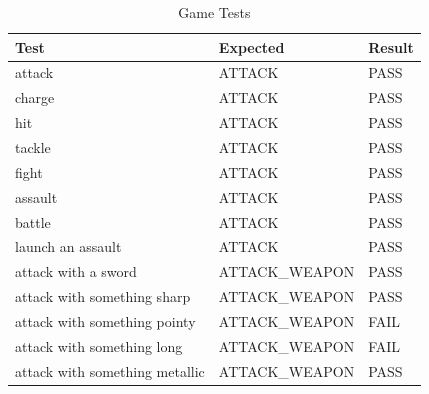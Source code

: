 \documentclass[11pt]{article}
\begin{document}
\begin{table}[H]
\scriptsize
\centering
\caption{Game Tests}
\label{table:game-scores}
\begin{tabular}{lll}
\multicolumn{1}{l|}{Test}                           & \multicolumn{1}{l|}{Expected}           & Result                       \\ \hline
\multicolumn{1}{l|}{attack}                         & \multicolumn{1}{l|}{ATTACK}             & \cellcolor[HTML]{67FD9A}PASS \\ \hline
\multicolumn{1}{l|}{charge}                         & \multicolumn{1}{l|}{ATTACK}             & \cellcolor[HTML]{67FD9A}PASS \\ \hline
\multicolumn{1}{l|}{hit}                            & \multicolumn{1}{l|}{ATTACK}             & \cellcolor[HTML]{67FD9A}PASS \\ \hline
\multicolumn{1}{l|}{tackle}                         & \multicolumn{1}{l|}{ATTACK}             & \cellcolor[HTML]{67FD9A}PASS \\ \hline
\multicolumn{1}{l|}{fight}                          & \multicolumn{1}{l|}{ATTACK}             & \cellcolor[HTML]{67FD9A}PASS \\ \hline
\multicolumn{1}{l|}{assault}                        & \multicolumn{1}{l|}{ATTACK}             & \cellcolor[HTML]{67FD9A}PASS \\ \hline
\multicolumn{1}{l|}{battle}                         & \multicolumn{1}{l|}{ATTACK}             & \cellcolor[HTML]{67FD9A}PASS \\ \hline
\multicolumn{1}{l|}{launch an assault}              & \multicolumn{1}{l|}{ATTACK}             & \cellcolor[HTML]{67FD9A}PASS \\ \hline
\multicolumn{1}{l|}{attack with a sword}            & \multicolumn{1}{l|}{ATTACK\_WEAPON}     & \cellcolor[HTML]{67FD9A}PASS \\ \hline
\multicolumn{1}{l|}{attack with something sharp}    & \multicolumn{1}{l|}{ATTACK\_WEAPON}     & \cellcolor[HTML]{67FD9A}PASS \\ \hline
\multicolumn{1}{l|}{attack with something pointy}   & \multicolumn{1}{l|}{ATTACK\_WEAPON}     & \cellcolor[HTML]{FD6864}FAIL \\ \hline
\multicolumn{1}{l|}{attack with something long}     & \multicolumn{1}{l|}{ATTACK\_WEAPON}     & \cellcolor[HTML]{FD6864}FAIL \\ \hline
\multicolumn{1}{l|}{attack with something metallic} & \multicolumn{1}{l|}{ATTACK\_WEAPON}     & \cellcolor[HTML]{67FD9A}PASS \\ \hline

\end{tabular}
\end{table}
\end{document}
